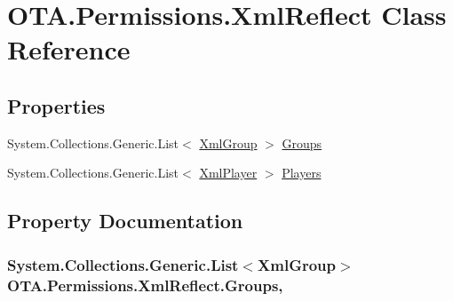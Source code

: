 \hypertarget{class_o_t_a_1_1_permissions_1_1_xml_reflect}{}\section{O\+T\+A.\+Permissions.\+Xml\+Reflect Class Reference}
\label{class_o_t_a_1_1_permissions_1_1_xml_reflect}
\subsection*{Properties}
\begin{DoxyCompactItemize}
\item 
System.\+Collections.\+Generic.\+List$<$ \hyperlink{class_o_t_a_1_1_permissions_1_1_xml_group}{Xml\+Group} $>$ \hyperlink{class_o_t_a_1_1_permissions_1_1_xml_reflect_a909f545367a3e60ec05a58b637443a99}{Groups}
\item 
System.\+Collections.\+Generic.\+List$<$ \hyperlink{class_o_t_a_1_1_permissions_1_1_xml_player}{Xml\+Player} $>$ \hyperlink{class_o_t_a_1_1_permissions_1_1_xml_reflect_a7bca868f279fd30dccb9e88f1930aa76}{Players}
\end{DoxyCompactItemize}


\subsection{Property Documentation}
\hypertarget{class_o_t_a_1_1_permissions_1_1_xml_reflect_a909f545367a3e60ec05a58b637443a99}{}
\subsubsection[{Groups}]{\setlength{\rightskip}{0pt plus 5cm}System.\+Collections.\+Generic.\+List$<${\bf Xml\+Group}$>$ O\+T\+A.\+Permissions.\+Xml\+Reflect.\+Groups\hspace{0.3cm}{\ttfamily [get]}, {\ttfamily [set]}}\label{class_o_t_a_1_1_permissions_1_1_xml_reflect_a909f545367a3e60ec05a58b637443a99}
\hypertarget{class_o_t_a_1_1_permissions_1_1_xml_reflect_a7bca868f279fd30dccb9e88f1930aa76}{}
